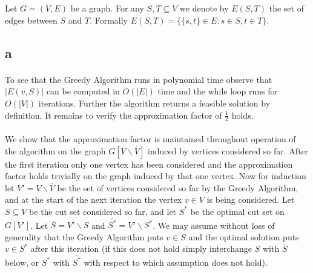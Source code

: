 \documentclass[letterpaper,12pt,oneside,onecolumn]{article}
\begin{document}
\section{}
\paragraph{}
Let $G = (V,E)$ be a graph. For any $S, T \subseteq V$ we denote by $E(S,T)$ the set of edges between $S$ and $T$. Formally $E(S,T) = \{\{s,t\} \in E: s \in S, t \in T\}$.
\subsection{a}
\paragraph{}
To see that the Greedy Algorithm runs in polynomial time observe that $|E(v,S)|$ can be computed in $O(|E|)$ time and the while loop runs for $O(|V|)$ iterations. Further the algorithm returns a feasible solution by definition. It remains to verify the approximation factor of $\frac{1}{2}$ holds.
\paragraph{}
We show that the approximation factor is maintained throughout operation of the algorithm on the graph $G[V\backslash \bar{V}]$ induced by vertices considered so far. After the first iteration only one vertex has been considered and the approximation factor holds trivially on the graph induced by that one vertex. Now for induction let $V' = V \backslash \bar{V}$ be the set of vertices considered so far by the Greedy Algorithm, and at the start of the next iteration the vertex $v \in V$ is being considered. Let $S \subseteq V$ be the cut set considered so far, and let $S^*$ be the optimal cut set on $G[V']$. Let $\bar{S} = V'\backslash S$ and $\bar{S^*} = V' \backslash S^*$. We may assume without loss of generality that the Greedy Algorithm puts $v \in S$ and the optimal solution puts $v \in S^*$ after this iteration (if this does not hold simply interchange $S$ with $\bar{S}$ below, or $S^*$ with $\bar{S^*}$ with respect to which assumption does not hold). 
\end{document}
